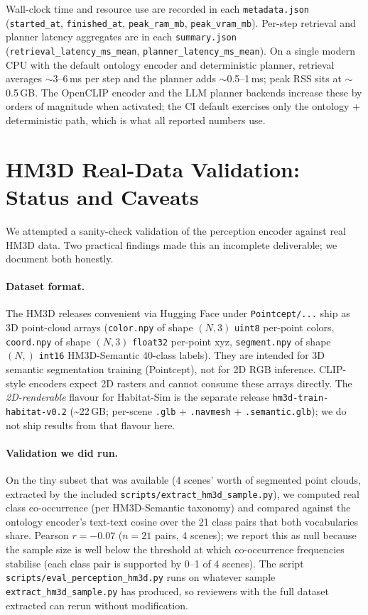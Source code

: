 \documentclass[conference,a4paper,10pt]{IEEEtran}
\begin{document}
Wall-clock time and resource use are recorded in each
\texttt{metadata.json} (\texttt{started\_at}, \texttt{finished\_at},
\texttt{peak\_ram\_mb}, \texttt{peak\_vram\_mb}). Per-step retrieval
and planner latency aggregates are in each \texttt{summary.json}
(\texttt{retrieval\_latency\_ms\_mean},
\texttt{planner\_latency\_ms\_mean}). On a single modern CPU with the
default ontology encoder and deterministic planner, retrieval averages
$\sim$3--6\,ms per step and the planner adds $\sim$0.5--1\,ms; peak RSS
sits at $\sim$0.5\,GB. The OpenCLIP encoder and the LLM planner
backends increase these by orders of magnitude when activated; the CI
default exercises only the ontology + deterministic path, which is what
all reported numbers use.

\section{HM3D Real-Data Validation: Status and Caveats}
\label{app:hm3d}

We attempted a sanity-check validation of the perception encoder
against real HM3D data. Two practical findings made this an
incomplete deliverable; we document both honestly.

\paragraph{Dataset format.}
The HM3D releases convenient via Hugging Face under
\texttt{Pointcept/...} ship as 3D point-cloud arrays
(\texttt{color.npy} of shape $(N,3)$ \texttt{uint8} per-point colors,
\texttt{coord.npy} of shape $(N,3)$ \texttt{float32} per-point xyz,
\texttt{segment.npy} of shape $(N,)$ \texttt{int16} HM3D-Semantic
40-class labels). They are intended for 3D semantic segmentation
training (Pointcept), not for 2D RGB inference. CLIP-style encoders
expect 2D rasters and cannot consume these arrays directly. The
\emph{2D-renderable} flavour for Habitat-Sim is the separate release
\texttt{hm3d-train-habitat-v0.2} (\textasciitilde{}22\,GB; per-scene
\texttt{.glb} + \texttt{.navmesh} + \texttt{.semantic.glb}); we do not
ship results from that flavour here.

\paragraph{Validation we did run.}
On the tiny subset that was available (4 scenes' worth of segmented
point clouds, extracted by the included
\texttt{scripts/extract\_hm3d\_sample.py}), we computed real
class co-occurrence (per HM3D-Semantic taxonomy) and compared against
the ontology encoder's text-text cosine over the 21 class pairs that
both vocabularies share. Pearson $r = -0.07$ ($n{=}21$ pairs, 4
scenes); we report this as null because the sample size is well below
the threshold at which co-occurrence frequencies stabilise (each
class pair is supported by 0--1 of 4 scenes). The script
\texttt{scripts/eval\_perception\_hm3d.py} runs on whatever sample
\texttt{extract\_hm3d\_sample.py} has produced, so reviewers with the
full dataset extracted can rerun without modification.
\end{document}
